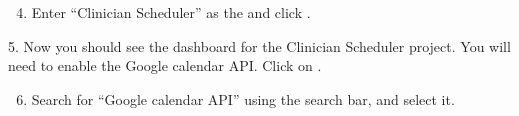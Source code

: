 \documentclass[letterpaper,10pt,english]{sphinxmanual}
\begin{document}
\begin{figure}[htbp]
\centering
{}\end{figure}

\begin{DUlineblock}{0em}
\item[] 
\end{DUlineblock}
\begin{enumerate}
\setcounter{enumi}{3}
\item {} 
Enter “Clinician Scheduler” as the  and click .

\end{enumerate}

\begin{figure}[htbp]
\centering
{}\end{figure}

\begin{DUlineblock}{0em}
\item[] 
\end{DUlineblock}

5. Now you should see the dashboard for the Clinician Scheduler project.
You will need to enable the Google calendar API. Click on .

\begin{figure}[htbp]
\centering
{}\end{figure}

\begin{DUlineblock}{0em}
\item[] 
\end{DUlineblock}
\begin{enumerate}
\setcounter{enumi}{5}
\item {} 
Search for “Google calendar API” using the search bar, and select it.

\end{enumerate}

\begin{figure}[htbp]
\centering
{}\end{figure}
\end{document}
